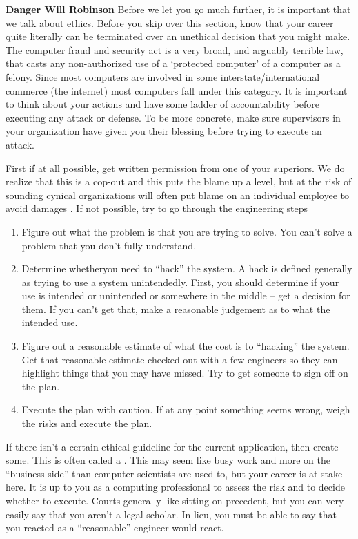 \textbf{Danger Will Robinson} Before we let you go much further, it is important that we talk about ethics.
Before you skip over this section, know that your career quite literally can be terminated over an unethical decision that you might make.
The computer fraud and security act is a very broad, and arguably terrible law, that casts any non-authorized use of a `protected computer' of a computer as a felony.
Since most computers are involved in some interstate/international commerce (the internet) most computers fall under this category.
It is important to think about your actions and have some ladder of accountability before executing any attack or defense.
To be more concrete, make sure supervisors in your organization have given you their blessing before trying to execute an attack.

First if at all possible, get written permission from one of your superiors.
We do realize that this is a cop-out and this puts the blame up a level, but at the risk of sounding cynical organizations will often put blame on an individual employee to avoid damages .
If not possible, try to go through the engineering steps

\begin{enumerate}
\item Figure out what the problem is that you are trying to solve.
  You can't solve a problem that you don't fully understand.
\item Determine whetheryou need to ``hack'' the system.
  A hack is defined generally as trying to use a system unintendedly.
  First, you should determine if your use is intended or unintended or somewhere in the middle -- get a decision for them.
  If you can't get that, make a reasonable judgement as to what the intended use.
\item Figure out a reasonable estimate of what the cost is to ``hacking'' the system.
  Get that reasonable estimate checked out with a few engineers so they can highlight things that you may have missed.
  Try to get someone to sign off on the plan.
\item Execute the plan with caution.
  If at any point something seems wrong, weigh the risks and execute the plan.
\end{enumerate}

If there isn't a certain ethical guideline for the current application, then create some.
This is often called a .
This may seem like busy work and more on the ``business side'' than computer scientists are used to, but your career is at stake here.
It is up to you as a computing professional to assess the risk and to decide whether to execute.
Courts generally like sitting on precedent, but you can very easily say that you aren't a legal scholar.
In lieu, you must be able to say that you reacted as a ``reasonable'' engineer would react.

